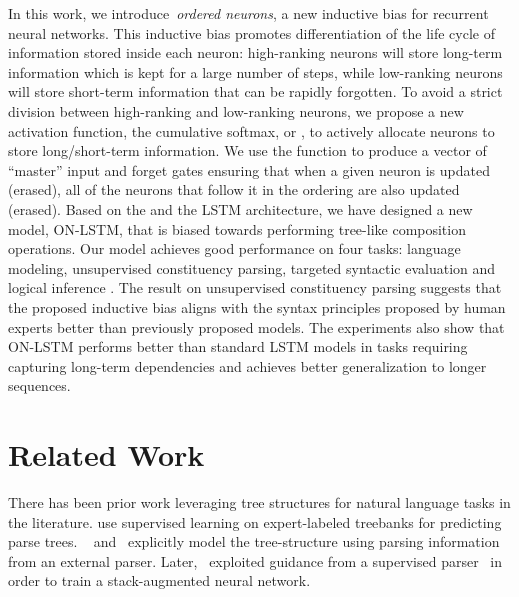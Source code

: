 \documentclass{article} \usepackage{iclr2019_conference,times}
\begin{document}
In this work, we introduce~\emph{ordered neurons}, a new inductive bias for recurrent neural networks.
This inductive bias promotes differentiation of the life cycle of information stored inside each neuron: high-ranking neurons will store long-term information which is kept for a large number of steps, while low-ranking neurons will store short-term information that can be rapidly forgotten.
To avoid a strict division between high-ranking and low-ranking neurons, we propose a new activation function, the cumulative softmax, or , to actively allocate neurons to store long/short-term information. 
We use the  function to produce a vector of “master” input and forget gates ensuring  that when a given neuron is updated (erased), all of the neurons that follow it in the ordering are also updated (erased).
Based on the  and the LSTM architecture, we have designed a new model, ON-LSTM, that is biased towards performing tree-like composition operations. Our model achieves good performance on four tasks: language modeling, unsupervised constituency parsing, targeted syntactic evaluation \citep{marvin2018targeted} and logical inference \citep{bowman2015tree}.
The result on unsupervised constituency parsing suggests that the proposed inductive bias aligns with the syntax principles proposed by human experts better than previously proposed models.
The experiments also show that ON-LSTM performs better than standard LSTM models in tasks requiring capturing long-term dependencies and achieves better generalization to longer sequences.





%
 
\section{Related Work}


There has been prior work leveraging tree structures for natural language tasks in the literature.
\cite{socher2010learning, alvarez2016tree, zhou2017generative, zhang2015top} use supervised learning on expert-labeled treebanks for predicting parse trees.
~\cite{socher2013recursive} and~\cite{tai2015improved} explicitly model the tree-structure using parsing information from an external parser.
Later,~\cite{bowman2016fast} exploited guidance from a supervised parser~\citep{klein2003accurate} in order to train a stack-augmented neural network.
\end{document}
